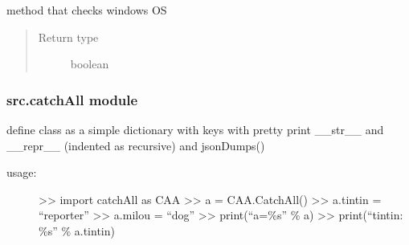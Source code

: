\documentclass[a4paper,10pt,english]{sphinxmanual}
\begin{document}

\begin{fulllineitems}
\label{commands/apidoc/src:src.architecture.is_windows}
method that checks windows OS
\begin{quote}\begin{description}
\item[{Return type}] \leavevmode
boolean

\end{description}\end{quote}

\end{fulllineitems}



\subsubsection{src.catchAll module}
\label{commands/apidoc/src:module-src.catchAll}\label{commands/apidoc/src:src-catchall-module}
define class as a simple dictionary with keys
with pretty print \_\_str\_\_ and \_\_repr\_\_ (indented as recursive)
and jsonDumps()
\begin{description}
\item[{usage:}] \leavevmode
\textgreater{}\textgreater{} import catchAll as CAA
\textgreater{}\textgreater{} a = CAA.CatchAll()
\textgreater{}\textgreater{} a.tintin = ``reporter''
\textgreater{}\textgreater{} a.milou = ``dog''
\textgreater{}\textgreater{} print(``a=\%s'' \% a)
\textgreater{}\textgreater{} print(``tintin: \%s'' \% a.tintin)

\end{description}
\end{document}
